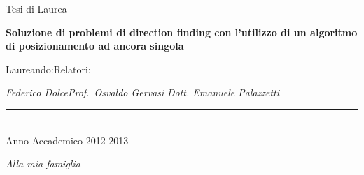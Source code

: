 \documentclass[a4paper,12pt]{report}
\def\titolotesi{Soluzione di problemi di direction finding con l'utilizzo di un algoritmo di posizionamento ad ancora singola} %
\def\laureando{Federico Dolce}       %
\def\annoaccademico{2012-2013}    %
\def\dedica{Alla mia famiglia}      %
\newlength\corpo
\begin{document}
\begin{titlepage}
\begin{center}
\vspace*{-2.5cm}

\Large Tesi di Laurea \par\bigskip



{\large \bf \titolotesi \par}

\bigskip\bigskip\bigskip

\end{center}\par

\hspace{0.05cm}Laureando:\hspace{7.3cm}Relatori:\par

\hspace{0.0cm}\emph{\laureando}\hfill\emph{Prof.~Osvaldo Gervasi}
\vfill\hfill\emph{Dott. Emanuele Palazzetti}
\vfill

\begin{center}

\rule{40mm}{0.01mm}\\

Anno Accademico \annoaccademico

\end{center}

\end{titlepage}
\newpage
\vspace*{2.5cm}
\begin{flushright}
\begin{Large}\emph{\dedica}\end{Large}
\end{flushright}
\frenchspacing
%
\tableofcontents
\listoffigures
{}
\pagestyle{fancy}
\fancyfoot[LE,RO]{\thepage \hfil}

\end{document}
